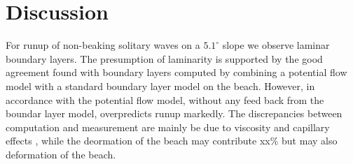 \documentclass[a4paper, 11pt, english, twoside, openright]{article}
\begin{document}
 
 
 
\section{Discussion}
\label{con_rem}

For runup of non-beaking solitary waves on a $5.1^\circ$ slope we 
observe laminar boundary layers. The presumption of laminarity is
 supported by the good agreement found with boundary layers computed 
by combining a potential flow model with a standard boundary layer model on the beach. However, in accordance with \cite{pedersen2013runp} the
potential flow model, without any feed back from the boundar layer model, overpredicts runup markedly.  
The discrepancies between computation and measurement are mainly be due to viscosity and capillary effects , while the deormation of the beach may contribute xx\% but may also deformation of the beach. 
\end{document}
